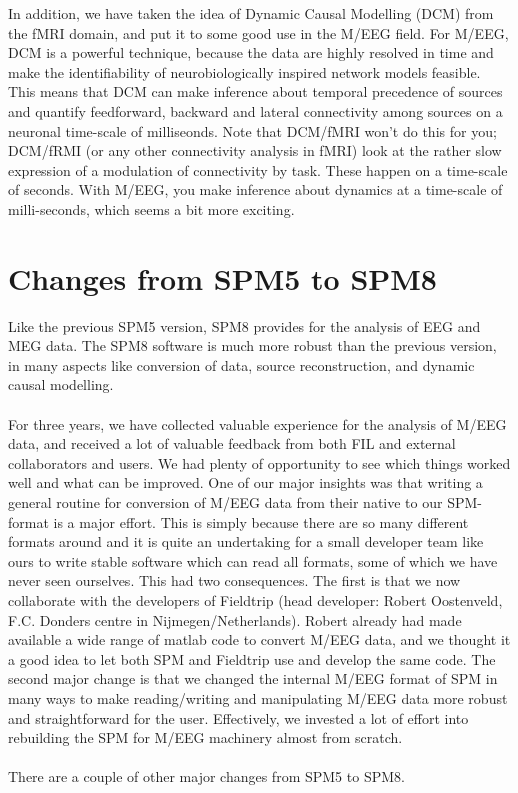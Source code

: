 In addition, we have taken the idea of Dynamic Causal Modelling (DCM)
from the fMRI domain, and put it to some good use in the M/EEG field. For
M/EEG, DCM is a powerful technique, because the data are highly
resolved in time and make the identifiability of neurobiologically
inspired network models feasible. This means that DCM can make
inference about temporal precedence of sources and quantify
feedforward, backward and lateral connectivity among sources on a
neuronal time-scale of milliseonds. Note that DCM/fMRI won't do this
for you; DCM/fRMI (or any other connectivity analysis in fMRI)
look at the rather slow expression of a modulation of connectivity by
task. These happen on a time-scale of seconds. With M/EEG, you make
inference about dynamics at a time-scale of milli-seconds, which seems
a bit more exciting.

\section{Changes from SPM5 to SPM8}
Like the previous SPM5 version, SPM8 provides for the analysis of EEG
and MEG data. The SPM8 software is much more robust than the previous
version, in many aspects like conversion of data, source
reconstruction, and dynamic causal modelling.
\\
\\
For three years, we have collected valuable experience
for the analysis of M/EEG data, and received a lot of valuable
feedback from both FIL and external collaborators and users. We had
plenty of opportunity to see which things worked well and what can be
improved. One of our major insights was that writing a general routine
for conversion of M/EEG data from their native to our SPM-format is a
major effort. This is simply because there are so many different
formats 
around and it is quite an undertaking for a small developer team like
ours to write stable software which can read all formats, some of
which we have never seen ourselves. This had two consequences. The
first is that we now collaborate with the developers of Fieldtrip
(head developer: Robert Oostenveld, F.C. Donders centre in
Nijmegen/Netherlands). Robert already had made available a wide range of
matlab code to convert M/EEG data, and we thought it a good idea to
let both SPM and Fieldtrip use and develop the same code. The second
major change is that we changed the internal M/EEG format of SPM in
many ways to make reading/writing and manipulating M/EEG data more
robust and straightforward for the user. Effectively, we invested a
lot of effort into rebuilding the SPM for M/EEG machinery almost from 
scratch. 
\\
\\
There are a couple of other major changes from SPM5 to SPM8. 

